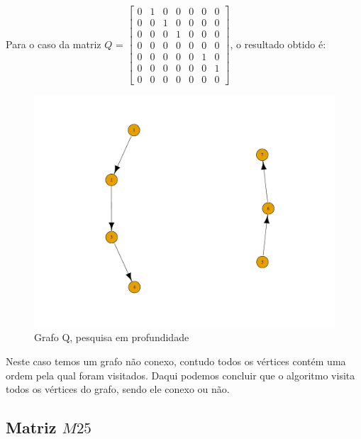 \documentclass[a4paper,12pt]{report}
\begin{document}
Para o caso da matriz $Q$ = $\begin{bmatrix}
    0&1&0&0&0&0&0\\
    0&0&1&0&0&0&0\\
    0&0&0&1&0&0&0\\
    0&0&0&0&0&0&0\\
    0&0&0&0&0&1&0\\
    0&0&0&0&0&0&1\\
    0&0&0&0&0&0&0
\end{bmatrix}$, o resultado obtido é:
\begin{figure}[H]
    \centering
        \includegraphics[scale=0.22]{img/dfsQ.pdf}
    \caption{Grafo Q, pesquisa em profundidade}
    \label{fig:dfsP}
\end{figure}

Neste caso temos um grafo não conexo, contudo todos os vértices contém uma ordem pela qual foram visitados. Daqui podemos concluir que o algoritmo visita todos os vértices do grafo, sendo ele conexo ou não.

\subsection*{Matriz $M25$}
\end{document}
